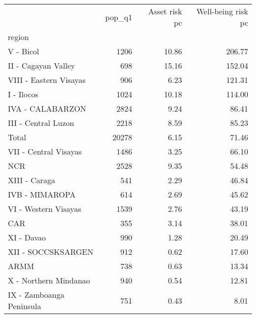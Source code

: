 \begin{tabular}{lrrr}
\toprule
{} &  pop\_q1 &  Asset risk pc &  Well-being risk pc \\
region                   &         &                &                     \\
\midrule
V - Bicol                &    1206 &          10.86 &              206.77 \\
II - Cagayan Valley      &     698 &          15.16 &              152.04 \\
VIII - Eastern Visayas   &     906 &           6.23 &              121.31 \\
I - Ilocos               &    1024 &          10.18 &              114.00 \\
IVA - CALABARZON         &    2824 &           9.24 &               86.41 \\
III - Central Luzon      &    2218 &           8.59 &               85.23 \\
Total                    &   20278 &           6.15 &               71.46 \\
VII - Central Visayas    &    1486 &           3.25 &               66.10 \\
NCR                      &    2528 &           9.35 &               54.48 \\
XIII - Caraga            &     541 &           2.29 &               46.84 \\
IVB - MIMAROPA           &     614 &           2.69 &               45.62 \\
VI - Western Visayas     &    1539 &           2.76 &               43.19 \\
CAR                      &     355 &           3.14 &               38.01 \\
XI - Davao               &     990 &           1.28 &               20.49 \\
XII - SOCCSKSARGEN       &     912 &           0.62 &               17.60 \\
ARMM                     &     738 &           0.63 &               13.34 \\
X - Northern Mindanao    &     940 &           0.54 &               12.81 \\
IX - Zamboanga Peninsula &     751 &           0.43 &                8.01 \\
\bottomrule
\end{tabular}
